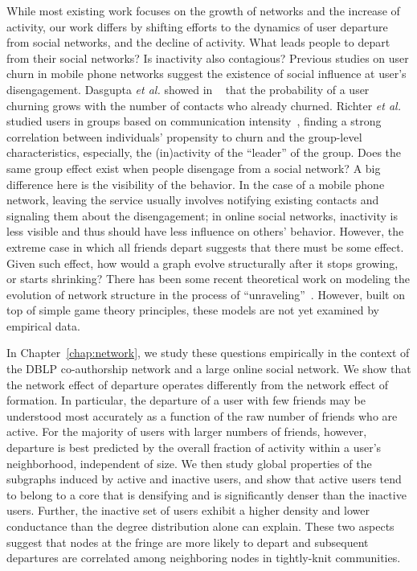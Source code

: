 \documentclass[phd,tocprelim]{cornell}
\begin{document}
While most existing work focuses on the growth of networks and the increase of activity, our work differs by shifting efforts to the dynamics of user departure from social networks, and the decline of activity. What leads people to depart from their social networks? Is inactivity also contagious? 
Previous studies on user churn in mobile phone networks suggest the existence of social influence at user's disengagement. Dasgupta \emph{et al.} showed in ~\cite{Dasgupta:2008} that the probability of a user churning grows with the number of contacts who already churned. Richter \emph{et al.} studied users in groups based on communication intensity~\cite{Richter:2010}, finding a strong correlation between individuals' propensity to churn and the group-level characteristics, especially, the (in)activity of the ``leader'' of the group. Does the same group effect exist when people disengage from a social network? A big difference here is the visibility of the behavior. In the case of a mobile phone network, leaving the service usually involves notifying existing contacts and signaling them about the disengagement; in online social networks, inactivity is less visible and thus should have less influence on others' behavior. However, the extreme case
in which all friends depart suggests that there must be some effect. Given such effect, how would a graph evolve structurally after it stops growing, or starts shrinking? There has been some recent theoretical work on modeling the evolution of network structure in the process of ``unraveling''~\cite{Bhawalkar:2012}. 
However, built on top of simple game theory principles, these models are not yet examined by empirical data.

In Chapter~\ref{chap:network}, we study these questions empirically in the context of the DBLP co-authorship network and a large online social network. We show that the network effect of departure operates differently from the network effect of formation.  In particular, the departure of a user with few friends may be understood most accurately as a function of the raw number of friends who are active.  For the majority of users with larger numbers of friends, however, departure is best predicted by the overall fraction of activity within a user's neighborhood, independent of size.  We then study global properties of the subgraphs induced by active and inactive users, and show that active users tend to belong to a core that is densifying and is significantly denser than
the inactive users. Further, the inactive set of users exhibit a higher density and lower conductance than the degree distribution alone can explain. These two aspects suggest that nodes at the fringe are more likely to depart and subsequent departures are correlated among neighboring nodes in tightly-knit communities. 
\end{document}
